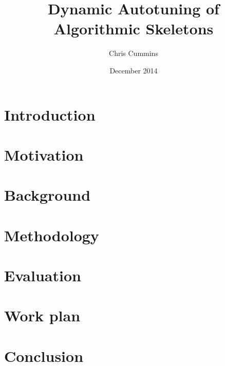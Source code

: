 
\author{Chris Cummins}

\date{December 2014}

\title{Dynamic Autotuning of Algorithmic Skeletons}

\newcommand{\subtitle}{MSc Research Proposal}

\newcommand{\degreeTitle}{MSc by Research\\ Pervasive Parallelism}

\newcommand{\institution}{School of Informatics,\\
  The University of Edinburgh}



\section{Introduction}\label{sec:introduction}


\section{Motivation}\label{sec:motivation}


\section{Background}\label{sec:background}


\section{Methodology}\label{sec:methodology}


\section{Evaluation}\label{sec:evaluation}


\section{Work plan}\label{sec:work-plan}


\section{Conclusion}\label{sec:conclusions}



